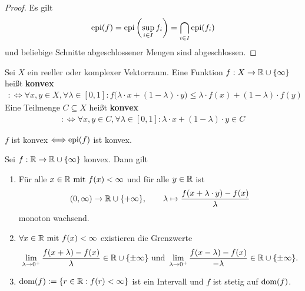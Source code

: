 \begin{proof}
	Es gilt
	\begin{align*}
		\operatorname{epi}(f)=\operatorname{epi}\left(\sup\limits_{i\in I} f_i\right)=\bigcap\limits_{i\in I}\operatorname{epi}(f_i)
	\end{align*}
	und beliebige Schnitte abgeschlossener Mengen sind abgeschlossen.
\end{proof}

\begin{definition}
	Sei $X$ ein reeller oder komplexer Vektorraum. 
	Eine Funktion $f:X\to\mathbb{R}\cup\lbrace\infty\rbrace$ heißt \textbf{konvex}
	\begin{align*}
		:\Longleftrightarrow
		\forall x,y\in X,\forall\lambda\in[0,1]:f\big(\lambda\cdot x+(1-\lambda)\cdot y\big)
		\leq\lambda\cdot f(x)+(1-\lambda)\cdot f(y) 
	\end{align*}
	Eine Teilmenge $C\subseteq X$ heißt \textbf{konvex}
	\begin{align*}
		:\Longleftrightarrow
		\forall x,y\in C,\forall\lambda\in[0,1]:\lambda\cdot x+(1-\lambda)\cdot y\in C
	\end{align*}
\end{definition}

\begin{lemma}
	$f$ ist konvex $\Longleftrightarrow\operatorname{epi}(f)$ ist konvex.
\end{lemma}

\begin{lemma}
	Sei $f:\mathbb{R}\to\mathbb{R}\cup\lbrace\infty\rbrace$ konvex. 
	Dann gilt
	\begin{enumerate}[label=(\alph*)]
		\item Für alle $x\in\mathbb{R}\text{ mit } f(x)<\infty$ und für alle $y\in\mathbb{R}$ ist
		\begin{align*}
			(0,\infty)\to\mathbb{R}\cup\lbrace +\infty\rbrace,\qquad
			\lambda\mapsto\frac{f(x+\lambda\cdot y)-f(x)}{\lambda}
		\end{align*}
		monoton wachsend.
		\item $\forall x\in\mathbb{R}\text{ mit } f(x)<\infty$ existieren die Grenzwerte
		\begin{align*}
			\lim\limits_{\lambda\to0^+}\frac{f(x+\lambda)-f(x)}{\lambda}\in\mathbb{R}\cup\lbrace\pm\infty\rbrace
			\text{ und }
			\lim\limits_{\lambda\to0^+}\frac{f(x-\lambda)-f(x)}{-\lambda}\in\mathbb{R}\cup\lbrace\pm\infty\rbrace.
		\end{align*}
		\item $\begin{aligned}
			\operatorname{dom}(f):=\lbrace r\in\mathbb{R}:f(r)<\infty\rbrace
		\end{aligned}$ 
		ist ein Intervall und $f$ ist stetig auf $\operatorname{dom}(f)$.
	\end{enumerate}
\end{lemma}

